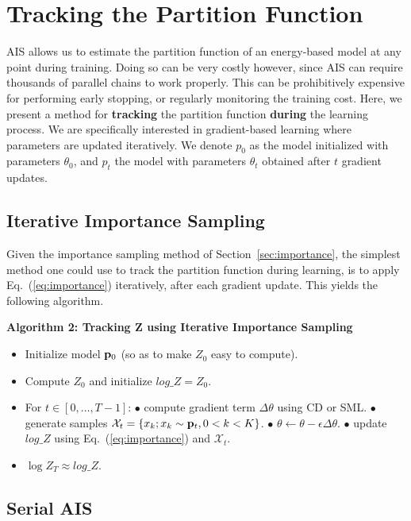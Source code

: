 \documentclass{article}
\begin{document}
\section{Tracking the Partition Function}
\label{sec:tracking}

AIS allows us to estimate the partition function of an energy-based model at
any point during training. Doing so can be very costly however, since AIS can
require thousands of parallel chains to work properly. This can be
prohibitively expensive for performing early stopping, or regularly monitoring
the training cost.  Here, we present a method for {\bf tracking} the partition
function {\bf during } the learning process. We are specifically interested in
gradient-based learning where parameters are updated iteratively. We denote
$p_0$ as the model initialized with parameters $\theta_0$, and $p_t$ the model
with parameters $\theta_t$ obtained after $t$ gradient updates.
\bigskip

\subsection{Iterative Importance Sampling}
\label{sec:iterative_is}

Given the importance sampling method of Section~\ref{sec:importance}, the
simplest method one could use to track the partition function during learning,
is to apply Eq.~(\ref{eq:importance}) iteratively, after each gradient update.
This yields the following algorithm.
\bigskip

{\bf Algorithm 2: Tracking Z using Iterative Importance Sampling}
\begin{itemize}
    \item Initialize model $\mathbf{p}_0$ (so as to make $Z_0$ easy to compute).
    \item Compute $Z_0$ and initialize $log\_Z = Z_0$.
    \item For $t \in [0,\dots,T-1]$:
    \subitem $\bullet$ compute gradient term $\Delta \theta$ using CD or SML.
    \subitem $\bullet$ generate samples $\mathcal{X}_t = \{x_k; x_k \sim \mathbf{p}_t, 0 < k < K \}$.
    \subitem $\bullet$ $\theta \leftarrow \theta - \epsilon \Delta \theta$.
    \subitem $\bullet$ update $log\_Z$ using Eq.~(\ref{eq:importance}) and $\mathcal{X}_t$.
    \item $\log Z_T \approx log\_Z$.
\end{itemize}
\bigskip


\subsection{Serial AIS}
\label{sec:serial_ais}
\end{document}

